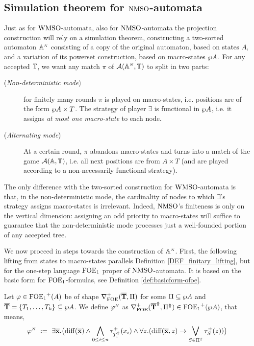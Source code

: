 \subsection{Simulation theorem for $\mathrm{NMSO}$-automata}\label{sec:simulation_nmso}

Just as for $\mathrm{WMSO}$-automata, also for $\mathrm{NMSO}$-automata the projection construction will rely on a simulation theorem, constructing a two-sorted automaton $\mathbb{A}^{{\scriptscriptstyle N}}$ consisting of a copy of the original automaton, based on states $A$, and a variation of its powerset construction, based on macro-states $\wp A$. For any accepted $\mathbb{T}$, we want any match $\pi$ of $\mathcal{A}(\mathbb{A}^{{\scriptscriptstyle N}},\mathbb{T})$ to split in two parts:
\begin{description}
\item[(\textit{Non-deterministic mode})] for finitely many rounds $\pi$ is
played on macro-states, i.e. positions are of the form $\wp A \times T$. 
The strategy of player $\exists$ is functional in $\wp A$, i.e. it assigns 
\emph{at most one macro-state} to each node.
\item[(\textit{Alternating mode})] 
At a certain round, $\pi$ abandons macro-states and turns into a match of the
game $\mathcal{A}(\mathbb{A},\mathbb{T})$, i.e. all next positions are from $A \times T$ (and 
are played according to a non-necessarily functional strategy). 
\end{description}
The only difference with the two-sorted construction for $\mathrm{WMSO}$-automata is 
that, in the non-deterministic mode, the cardinality of nodes to which 
$\exists$'s strategy assigns macro-states is irrelevant. 
Indeed, $\mathrm{NMSO}$'s finiteness is only on the vertical dimension: assigning an 
odd priority to macro-states will suffice to guarantee that the 
non-deterministic mode processes just a well-founded portion of any accepted
tree.

We now proceed in steps towards the construction of $\mathbb{A}^{{\scriptscriptstyle N}}$. First, the following lifting from states to macro-states parallels Definition \ref{DEF_finitary_lifting}, but for the one-step language $\mathrm{FOE}_1$ proper of $\mathrm{NMSO}$-automata. It is based on the basic form for $\mathrm{FOE}_1$-formulas, see Definition \ref{def:basicform-ofoe}.

\begin{definition}\label{DEF_noetherian_lifting}
Let $\varphi \in {\ensuremath{\mathrm{FOE}_1}}^+(A)$ be of shape $\nabla^+_{\mathrm{FOE}}(\overline{{\mathbf{T}}},\Pi)$ for some $\Pi \subseteq \wp A$ and $\overline{{\mathbf{T}}} = \{T_1,\dots,T_k\} \subseteq \wp A$. We define $\varphi^{{\scriptscriptstyle N}}$ as $\nabla^+_{\mathrm{FOE}}(\overline{{\mathbf{T}}}^{\Uparrow},\Pi^{\Uparrow}) \in {\ensuremath{\mathrm{FOE}_1}}^+(\wp A )$, that means,
\begin{equation}\label{eq:unfoldingNablaofoe}
\varphi^{{\scriptscriptstyle N}} \ \mathrel{: =} \
    \exists \overline{{\mathbf{x}}}.\big(\mathrm{diff}(\overline{{\mathbf{x}}}) \land \bigwedge_{0 \leq i \leq n} \tau^+_{T^{\Uparrow}_i}(x_i)
\land
    \forall z.(\mathrm{diff}(\overline{{\mathbf{x}}},z) \to \bigvee_{S\in \Pi^{\Uparrow} } \tau^+_S(z))\big)
\end{equation}
\end{definition}

